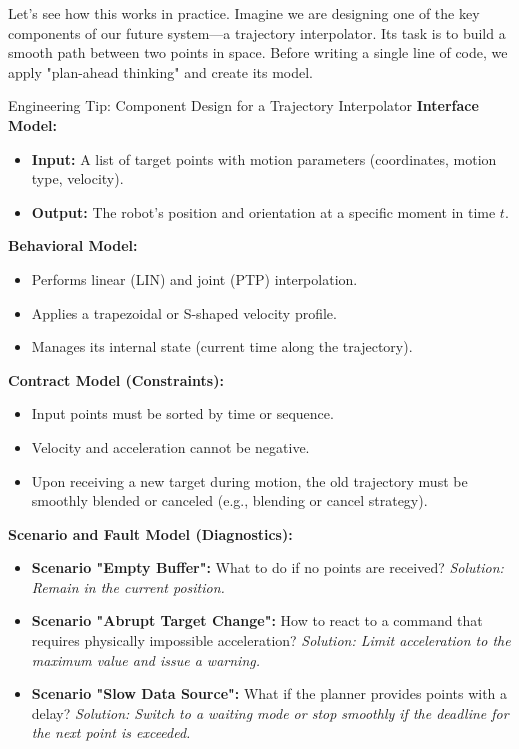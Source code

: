 Let's see how this works in practice. Imagine we are designing one of the key components of our future system—a trajectory interpolator. Its task is to build a smooth path between two points in space. Before writing a single line of code, we apply "plan-ahead thinking" and create its model.

\begin{tipbox}{Engineering Tip: Component Design for a Trajectory Interpolator}
\textbf{Interface Model:}
\begin{itemize}
    \item \textbf{Input:} A list of target points with motion parameters (coordinates, motion type, velocity).
    \item \textbf{Output:} The robot's position and orientation at a specific moment in time $t$.
\end{itemize}

\textbf{Behavioral Model:}
\begin{itemize}
    \item Performs linear (LIN) and joint (PTP) interpolation.
    \item Applies a trapezoidal or S-shaped velocity profile.
    \item Manages its internal state (current time along the trajectory).
\end{itemize}

\textbf{Contract Model (Constraints):}
\begin{itemize}
    \item Input points must be sorted by time or sequence.
    \item Velocity and acceleration cannot be negative.
    \item Upon receiving a new target during motion, the old trajectory must be smoothly blended or canceled (e.g., blending or cancel strategy).
\end{itemize}

\textbf{Scenario and Fault Model (Diagnostics):}
\begin{itemize}
    \item \textbf{Scenario "Empty Buffer":} What to do if no points are received? \textit{Solution: Remain in the current position.}
    \item \textbf{Scenario "Abrupt Target Change":} How to react to a command that requires physically impossible acceleration? \textit{Solution: Limit acceleration to the maximum value and issue a warning.}
    \item \textbf{Scenario "Slow Data Source":} What if the planner provides points with a delay? \textit{Solution: Switch to a waiting mode or stop smoothly if the deadline for the next point is exceeded.}
\end{itemize}
\end{tipbox}

